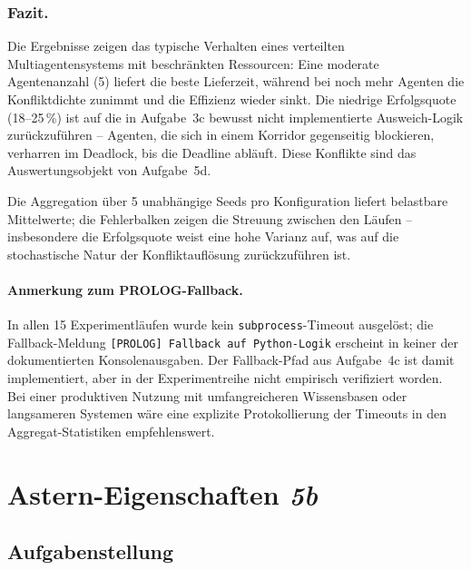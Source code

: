 \subsubsection{Fazit.}
Die Ergebnisse zeigen das typische Verhalten eines verteilten Multiagentensystems mit beschränkten Ressourcen: Eine moderate Agentenanzahl (5) liefert die beste Lieferzeit, während bei noch mehr Agenten die Konfliktdichte zunimmt und die Effizienz wieder sinkt. Die niedrige Erfolgsquote (18--25\,\%) ist auf die in Aufgabe~3c bewusst nicht implementierte Ausweich-Logik zurückzuführen -- Agenten, die sich in einem Korridor gegenseitig blockieren, verharren im Deadlock, bis die Deadline abläuft. Diese Konflikte sind das Auswertungsobjekt von Aufgabe~5d.

Die Aggregation über 5 unabhängige Seeds pro Konfiguration liefert belastbare Mittelwerte; die Fehlerbalken zeigen die Streuung zwischen den Läufen -- insbesondere die Erfolgsquote weist eine hohe Varianz auf, was auf die stochastische Natur der Konfliktauflösung zurückzuführen ist.

\paragraph{Anmerkung zum \acs{PROLOG}-Fallback.}
In allen 15 Experimentl\"aufen wurde kein \texttt{subprocess}-Timeout ausgel\"ost; die Fallback-Meldung \texttt{[PROLOG] Fallback auf Python-Logik} erscheint in keiner der dokumentierten Konsolenausgaben. Der Fallback-Pfad aus Aufgabe~4c ist damit implementiert, aber in der Experimentreihe nicht empirisch verifiziert worden. Bei einer produktiven Nutzung mit umfangreicheren Wissensbasen oder langsameren Systemen w\"are eine explizite Protokollierung der Timeouts in den Aggregat-Statistiken empfehlenswert.


\section{\acs{Astern}-Eigenschaften \textit{5b}}
\label{sec:aufgabe5b}

\subsection{Aufgabenstellung}

